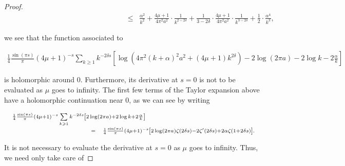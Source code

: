 \documentclass{jams-l}
\theoremstyle{definition}
\theoremstyle{remark}
\numberwithin{equation}{section}
\begin{document}
\begin{proof}
\[\begin{array}{lll}
                                \qquad \qquad \qquad \qquad \qquad \qquad \qquad \qquad & \scriptstyle \leqslant & \scriptstyle \frac{\alpha^2}{k^2} + \frac{4 \mu + 1}{4 \pi^2 a^2} \cdot \frac{1}{k^{2-2\delta}} + \frac{1}{3-2\delta} \cdot \frac{4 \mu + 1}{4 \pi^2 a^2} \cdot \frac{1}{k^{3-2\delta}} + \frac{1}{2} \cdot \frac{\alpha^4}{k^3},
                            \end{array} \]
                        
                        \noindent we see that the function associated to
                        
                        \[ \begin{array}{c}
                                \scriptstyle \frac{1}{4} \frac{\sin \left( \pi s \right)}{\pi} \left( 4 \mu + 1 \right)^{-s} \sum\limits_{k \geqslant 1} k^{-2 \delta s} \left[ \log \left( 4 \pi^2 \left( k + \alpha \right)^2 a^2 + \left( 4 \mu + 1 \right) k^{2 \delta} \right) - 2 \log \left( 2 \pi a \right) - 2 \log k - 2 \frac{\alpha}{k} \right]
                            \end{array} \]
                        
                        \noindent is holomorphic around $0$. Furthermore, its derivative at $s=0$ is not to be evaluated as $\mu$ goes to infinity. The first few terms of the Taylor expansion above have a holomorphic continuation near $0$, as we can see by writing
                        
                        \[ \begin{array}{lll}
                                \multicolumn{3}{l}{\scriptstyle \frac{1}{4} \frac{\sin \left( \pi s \right)}{\pi} \left( 4 \mu + 1 \right)^{-s} \sum\limits_{k \geqslant 1} k^{-2 \delta s} \left[ 2 \log \left( 2 \pi a \right) + 2 \log k + 2 \frac{\alpha}{k} \right]} \\[0.5em]
                                
                                \qquad \qquad \qquad \qquad \qquad & \scriptstyle = & \scriptstyle \frac{1}{4} \frac{\sin \left( \pi s \right)}{\pi} \left( 4 \mu + 1 \right)^{-s} \left[ 2 \log \left( 2 \pi a \right) \zeta \left( 2 \delta s \right) - 2 \zeta' \left( 2 \delta s \right) + 2 \alpha \zeta \left( 1 + 2 \delta s \right) \right].
                            \end{array} \]
                        
                        \noindent It is not necessary to evaluate the derivative at $s=0$ as $\mu$ goes to infinity. Thus, we need only take care of
                        

\end{proof}
\end{document}
